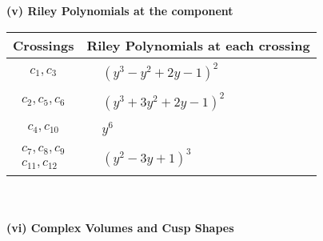 \documentclass[1p]{elsarticle_modified}
\theoremstyle{definition}
\begin{document}
\newpage\renewcommand{\arraystretch}{1}
\flushleft \textbf{(v) Riley Polynomials at the component}\newline \\
\begin{tabular}{m{50pt}|m{274pt}}
Crossings & \hspace{64pt}Riley Polynomials at each crossing \\
\hline $$\begin{aligned}c_{1},c_{3}\end{aligned}$$&$\begin{aligned}
&(y^3- y^2+2 y-1)^2
\end{aligned}$\\
\hline $$\begin{aligned}c_{2},c_{5},c_{6}\end{aligned}$$&$\begin{aligned}
&(y^3+3 y^2+2 y-1)^2
\end{aligned}$\\
\hline $$\begin{aligned}c_{4},c_{10}\end{aligned}$$&$\begin{aligned}
&y^6
\end{aligned}$\\
\hline $$\begin{aligned}c_{7},c_{8},c_{9}\\c_{11},c_{12}\end{aligned}$$&$\begin{aligned}
&(y^2-3 y+1)^3
\end{aligned}$\\
\hline
\end{tabular}\\~\\
\newpage\flushleft \textbf{(vi) Complex Volumes and Cusp Shapes}
\end{document}

